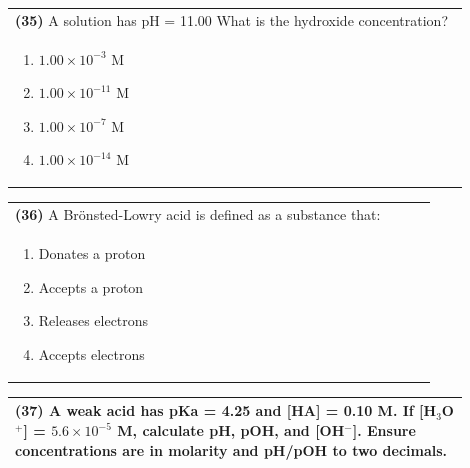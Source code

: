 \documentclass{article}
\begin{document}
\noindent\begin{tabular}{|p{0.9\linewidth}|}
\hline
\textbf{(35)} A solution has pH = 11.00 What is the hydroxide concentration? \\[0.2cm]
\begin{minipage}[t]{0.85\linewidth}
\begin{enumerate}[label=\alph*.]
\item $1.00\times10^{-3}$ M \item $1.00\times10^{-11}$ M \item $1.00\times10^{-7}$ M \item $1.00\times10^{-14}$ M
\end{enumerate}
\end{minipage}\\[0.2cm]
\hline
\end{tabular}

\noindent\begin{tabular}{|p{0.9\linewidth}|}
\hline
\textbf{(36)} A Brönsted-Lowry acid is defined as a substance that: \\[0.2cm]
\begin{minipage}[t]{0.85\linewidth}
\begin{enumerate}[label=\alph*.]
\item Donates a proton
\item Accepts a proton
\item Releases electrons
\item Accepts electrons
\end{enumerate}
\end{minipage}\\[0.2cm]
\hline
\end{tabular}
\newpage

\noindent\begin{tabular}{|p{0.9\linewidth}|}
\hline
\textbf{(37)} A weak acid has pKa = 4.25 and [HA] = 0.10 M. If [H$_3$O$^+$] = $5.6\times10^{-5}$ M, calculate pH, pOH, and [OH$^-$].  Ensure concentrations are in molarity and pH/pOH to two decimals. \\[4cm]
\hline
\end{tabular}

\noindent{}
\end{document}
